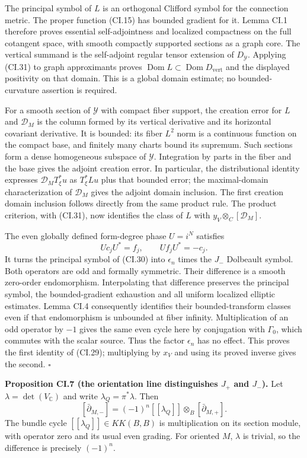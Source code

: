 \documentclass[
  11pt,
]{article}
\begin{document}
The principal symbol of \(L\) is an orthogonal Clifford symbol for the
connection metric. The proper function (CI.15) has bounded gradient for
it. Lemma CI.1 therefore proves essential self-adjointness and localized
compactness on the full cotangent space, with smooth compactly supported
sections as a graph core. The vertical summand is the self-adjoint
regular tensor extension of \(D_{\mathcal Y}\). Applying (CI.31) to
graph approximants proves
\(\operatorname{Dom}L\subset\operatorname{Dom}D_{\mathrm{vert}}\) and
the displayed positivity on that domain. This is a global domain
estimate; no bounded-curvature assertion is required.

For a smooth section of \(\mathcal Y\) with compact fiber support, the
creation error for \(L\) and \(\mathscr D_M\) is the column formed by
its vertical derivative and its horizontal covariant derivative. It is
bounded: its fiber \(L^2\) norm is a continuous function on the compact
base, and finitely many charts bound its supremum. Such sections form a
dense homogeneous subspace of \(\mathcal Y\). Integration by parts in
the fiber and the base gives the adjoint creation error. In particular,
the distributional identity expresses \(\mathscr D_MT_\xi^*u\) as
\(T_\xi^*Lu\) plus that bounded error; the maximal-domain
characterization of \(\mathscr D_M\) gives the adjoint domain inclusion.
The first creation domain inclusion follows directly from the same
product rule. The product criterion, with (CI.31), now identifies the
class of \(L\) with \(y_V\otimes_C[\mathscr D_M]\).

The even globally defined form-degree phase \(U=i^N\) satisfies \[
 Uc_jU^*=f_j,\qquad Uf_jU^*=-c_j.
\] It turns the principal symbol of (CI.30) into \(\epsilon_n\) times
the \(J_-\) Dolbeault symbol. Both operators are odd and formally
symmetric. Their difference is a smooth zero-order endomorphism.
Interpolating that difference preserves the principal symbol, the
bounded-gradient exhaustion and all uniform localized elliptic
estimates. Lemma CI.4 consequently identifies their bounded-transform
classes even if that endomorphism is unbounded at fiber infinity.
Multiplication of an odd operator by \(-1\) gives the same even cycle
here by conjugation with \(\Gamma_0\), which commutes with the scalar
source. Thus the factor \(\epsilon_n\) has no effect. This proves the
first identity of (CI.29); multiplying by \(x_V\) and using its proved
inverse gives the second. \(\square\)

\textbf{Proposition CI.7 (the orientation line distinguishes \(J_+\) and
\(J_-\)).} Let \(\lambda=\det(V_{\mathbb C})\) and write
\(\lambda_Q=\pi^*\lambda\). Then \[
 [\bar\partial_{M,-}]
   =(-1)^n[\![\lambda_Q]\!]\otimes_B[\bar\partial_{M,+}].
 \tag{CI.32}
\] The bundle cycle \([\![\lambda_Q]\!]\in KK(B,B)\) is multiplication
on its section module, with operator zero and its usual even grading.
For oriented \(M\), \(\lambda\) is trivial, so the difference is
precisely \((-1)^n\).
\end{document}

